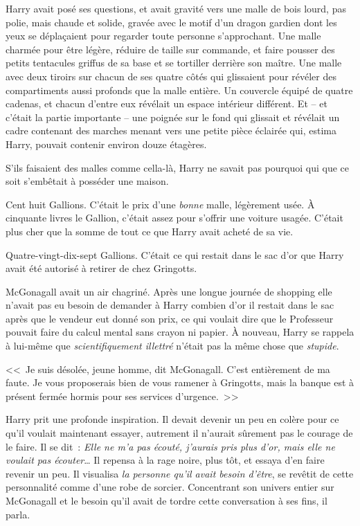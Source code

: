 Harry avait posé ses questions, et avait gravité vers une malle de bois lourd, pas polie, mais chaude et solide, gravée avec le motif d'un dragon gardien dont les yeux se déplaçaient pour regarder toute personne s'approchant. Une malle charmée pour être légère, réduire de taille sur commande, et faire pousser des petits tentacules griffus de sa base et se tortiller derrière son maître. Une malle avec deux tiroirs sur chacun de ses quatre côtés qui glissaient pour révéler des compartiments aussi profonds que la malle entière. Un couvercle équipé de quatre cadenas, et chacun d'entre eux révélait un espace intérieur différent. Et -- et c'était la partie importante -- une poignée sur le fond qui glissait et révélait un cadre contenant des marches menant vers une petite pièce éclairée qui, estima Harry, pouvait contenir environ douze étagères.

S'ils faisaient des malles comme cella-là, Harry ne savait pas pourquoi qui que ce soit s'embêtait à posséder une maison.

Cent huit Gallions. C'était le prix d'une \emph{bonne} malle, légèrement usée. À cinquante livres le Gallion, c'était assez pour s'offrir une voiture usagée. C'était plus cher que la somme de tout ce que Harry avait acheté de sa vie.

Quatre-vingt-dix-sept Gallions. C'était ce qui restait dans le sac d'or que Harry avait été autorisé à retirer de chez Gringotts.

McGonagall avait un air chagriné. Après une longue journée de shopping elle n'avait pas eu besoin de demander à Harry combien d'or il restait dans le sac après que le vendeur eut donné son prix, ce qui voulait dire que le Professeur pouvait faire du calcul mental sans crayon ni papier. À nouveau, Harry se rappela à lui-même que \emph{scientifiquement illettré} n'était pas la même chose que \emph{stupide}.

<<~Je suis désolée, jeune homme, dit McGonagall. C'est entièrement de ma faute. Je vous proposerais bien de vous ramener à Gringotts, mais la banque est à présent fermée hormis pour ses services d'urgence.~>>

Harry prit une profonde inspiration. Il devait devenir un peu en colère pour ce qu'il voulait maintenant essayer, autrement il n'aurait sûrement pas le courage de le faire. Il se dit~: \emph{Elle ne m'a pas écouté, j'aurais pris plus d'or, mais elle ne voulait pas écouter}… Il repensa à la rage noire, plus tôt, et essaya d'en faire revenir un peu. Il visualisa \emph{la personne qu'il avait besoin d'être}, se revêtit de cette personnalité comme d'une robe de sorcier. Concentrant son univers entier sur McGonagall et le besoin qu'il avait de tordre cette conversation à ses fins, il parla.

